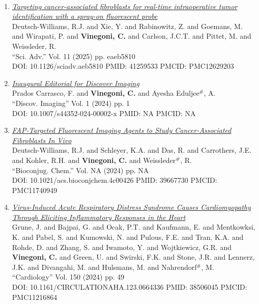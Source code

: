 \documentclass{resume}
\newcommand{\titresection}[1]
{
  \vspace{0em}
  \definecolor{gris_clair}{rgb}{0.90, 0.90, 0.90}
  \colorbox{gris_clair}{\makebox[\textwidth][l]{\rule[-0.1em]{0em}{0.5em}\large{\textsc{#1}}}} \\
}
\begin{document}
\begin{category}{~~}
\hypertarget{articlesa}{\citemnobullet \titresection{\textbf{\large
PUBLICATIONS: ARTICLES}}}



\begin{enumerate}



\item \href{https://cvinegoni.github.io/assets/pdf/papers/2025-SA.pdf}{\it  Targeting cancer-associated fibroblasts for real-time intraoperative tumor identification with a spray-on fluorescent probe} \\ Deutsch-Williams, R.J. and Xie, Y. and Rabinowitz, Z. and Goemans, M. and Wirapati, P. and {\bf Vinegoni, C.} and Carlson, J.C.T. and Pittet, M. and Weissleder, R.  \\ ``Sci. Adv.'' Vol. 11 (2025) pp. eaeb5810 \\ DOI: 10.1126/sciadv.aeb5810 PMID: 41259533 PMCID:  PMC12629203

\item \href{https://cvinegoni.github.io/assets/pdf/papers/2024-DI.pdf}{\it  Inaugural Editorial for Discover Imaging} \\ Prados Carrasco, F. and {\bf Vinegoni, C.} and Ayesha Eduljee$^\#$, A.  \\ ``Discov. Imaging'' Vol. 1 (2024) pp. 1 \\ DOI: 10.1007/s44352-024-00002-x PMID: NA PMCID:  NA

\item \href{https://cvinegoni.github.io/assets/pdf/papers/2024-CRCLT.pdf}{\it  FAP-Targeted Fluorescent Imaging Agents to Study Cancer-Associated Fibroblasts In Vivo} \\ Deutsch-Williams, R.J. and Schleyer, K.A. and Das, R. and Carrothers, J.E. and Kohler, R.H. and {\bf Vinegoni, C.}  and Weissleder$^\#$, R. \\ ``Bioconjug. Chem.'' Vol. NA (2024) pp. NA \\ DOI: 10.1021/acs.bioconjchem.4c00426 PMID: 39667730 PMCID:  PMC11740949

\item \href{https://cvinegoni.github.io/assets/pdf/papers/2024-CRCLT.pdf}{\it  Virus-Induced Acute Respiratory Distress Syndrome Causes Cardiomyopathy Through Eliciting Inflammatory Responses in the Heart} \\Grune, J. and Bajpai, G. and Ocak, P.T. and Kaufmann, E. and Mentkowksi, K. and Pabel, S. and Kumowski, N. and Pulous, F.E. and Tran, K.A. and Rohde, D. and Zhang, S. and Iwamoto, Y. and Wojtkiewicz, G.R. and {\bf Vinegoni, C.}  and Green, U. and Swirski, F.K. and Stone, J.R. and Lennerz, J.K. and Divangahi, M. and Hulsmans, M. and Nahrendorf$^\#$,  M. \\ ``Cardiology'' Vol. 150 (2024) pp. 49 \\ DOI: 10.1161/CIRCULATIONAHA.123.0664336 PMID: 38506045 PMCID:  PMC11216864


\end{enumerate}
\end{category}
\end{document}
